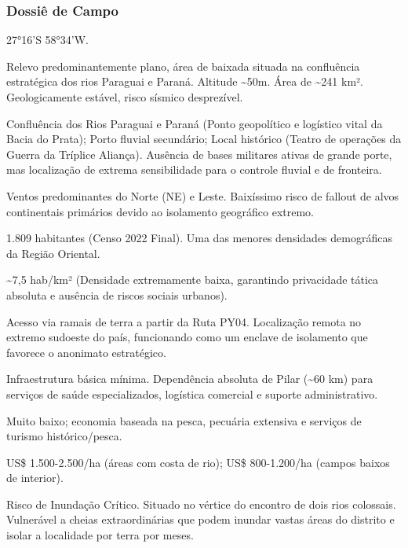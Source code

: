 \subsubsection{Dossiê de Campo}
\begin{description}[style=nextline,leftmargin=0.5cm,font=\bfseries]
\item[Coordenadas]  27°16'S 58°34'W.
\item[Topografia]  Relevo predominantemente plano, área de baixada situada na confluência estratégica dos rios Paraguai e Paraná. Altitude \textasciitilde 50m. Área de \textasciitilde 241 km². Geologicamente estável, risco sísmico desprezível.
\item[Alvos Estratégicos]  Confluência dos Rios Paraguai e Paraná (Ponto geopolítico e logístico vital da Bacia do Prata); Porto fluvial secundário; Local histórico (Teatro de operações da Guerra da Tríplice Aliança). Ausência de bases militares ativas de grande porte, mas localização de extrema sensibilidade para o controle fluvial e de fronteira.
\item[Fallout]  Ventos predominantes do Norte (NE) e Leste. Baixíssimo risco de fallout de alvos continentais primários devido ao isolamento geográfico extremo.
\item[População]  1.809 habitantes (Censo 2022 Final). Uma das menores densidades demográficas da Região Oriental.
\item[Densidade]  \textasciitilde 7,5 hab/\allowbreak km² (Densidade extremamente baixa, garantindo privacidade tática absoluta e ausência de riscos sociais urbanos).
\item[Vias de Acesso]  Acesso via ramais de terra a partir da Ruta PY04. Localização remota no extremo sudoeste do país, funcionando como um enclave de isolamento que favorece o anonimato estratégico.
\item[Serviços]  Infraestrutura básica mínima. Dependência absoluta de Pilar (\textasciitilde 60 km) para serviços de saúde especializados, logística comercial e suporte administrativo.
\item[Custo de Vida]  Muito baixo; economia baseada na pesca, pecuária extensiva e serviços de turismo histórico/\allowbreak pesca.
\item[Preço da Terra]  US\$ 1.500-2.500/\allowbreak ha (áreas com costa de rio); US\$ 800-1.200/\allowbreak ha (campos baixos de interior).
\item[Hidrologia]  Risco de Inundação Crítico. Situado no vértice do encontro de dois rios colossais. Vulnerável a cheias extraordinárias que podem inundar vastas áreas do distrito e isolar a localidade por terra por meses.

\end{description}
